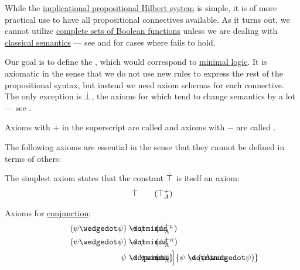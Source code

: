 \begin{definition}\label{def:minimal_propositional_hilbert_system}
  While the \hyperref[def:implicational_propositional_hilbert_system]{implicational propositional Hilbert system} is simple, it is of more practical use to have all propositional connectives available. As it turns out, we cannot utilize \hyperref[def:boolean_closure/complete]{complete sets of Boolean functions} unless we are dealing with \hyperref[def:propositional_entailment]{classical semantics} --- see  and  for cases where  fails to hold.

  Our goal is to define the , which would correspond to \hyperref[def:minimal_logic]{minimal logic}. It is axiomatic in the sense that we do not use new rules to express the rest of the propositional syntax, but instead we need axiom schemas for each connective. The only exception is \hyperref[def:propositional_alphabet/constants/verum]{\( \dot\bot \)}, the axioms for which tend to change semantics by a lot --- see .

  Axioms with \( + \) in the superscript are called  and axioms with \( - \) are called .

  The following axioms are essential in the sense that they cannot be defined in terms of others:
  \begin{thmenum}[series=def:minimal_propositional_hilbert_system]
     The simplest axiom states that the constant \hyperref[def:propositional_alphabet/constants/verum]{\( \dot\top \)} is itself an axiom:
    \begin{equation}\label{eq:def:minimal_propositional_hilbert_system/top/intro}
      \syntop \tag{\( \syntop_A^+ \)}
    \end{equation}

     Axioms for \hyperref[def:propositional_alphabet/connectives/conjunction]{conjunction}:
    \begin{align}
      \mathllap{ (\psi \synwedge \psi) } &\synimplies \mathrlap{ \psi } \tag{\( \wedge_A^{+_L} \)} \label{eq:def:minimal_propositional_hilbert_system/and/elim_left} \\
      \mathllap{ (\psi \synwedge \psi) } &\synimplies \mathrlap{ \psi } \tag{\( \wedge_A^{+_R} \)} \label{eq:def:minimal_propositional_hilbert_system/and/elim_right} \\
      \mathllap{ \psi }               &\synimplies \mathrlap{ \parens[\Big]{ \psi \synimplies (\psi \synwedge \psi) } } \tag{\( \wedge_A^{-} \)} \label{eq:def:minimal_propositional_hilbert_system/and/intro}
    \end{align}


\end{thmenum}
\end{definition}
